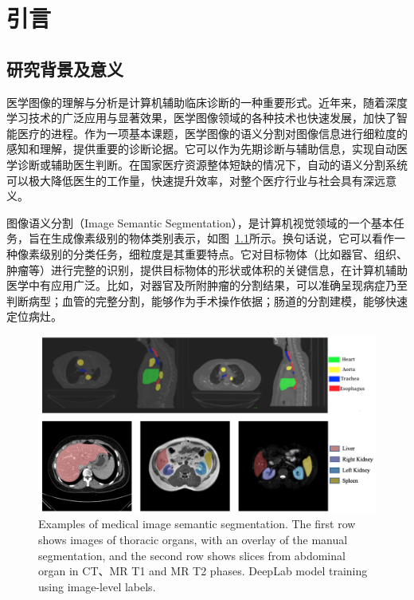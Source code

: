 \chapter{引言}

\section{研究背景及意义}
医学图像的理解与分析是计算机辅助临床诊断的一种重要形式。近年来，随着深度学习技术的广泛应用与显著效果，医学图像领域的各种技术也快速发展，加快了智能医疗的进程。作为一项基本课题，医学图像的语义分割对图像信息进行细粒度的感知和理解，提供重要的诊断论据。它可以作为先期诊断与辅助信息，实现自动医学诊断或辅助医生判断。在国家医疗资源整体短缺的情况下，自动的语义分割系统可以极大降低医生的工作量，快速提升效率，对整个医疗行业与社会具有深远意义。

图像语义分割（Image Semantic Segmentation），是计算机视觉领域的一个基本任务，旨在生成像素级别的物体类别表示\citep{long2015fully,chen2017deeplab,ronneberger2015u,isensee2019automated}，如图~\ref{c1_fig1}所示。换句话说，它可以看作一种像素级别的分类任务，细粒度是其重要特点。它对目标物体（比如器官、组织、肿瘤等）进行完整的识别，提供目标物体的形状或体积的关键信息，在计算机辅助医学中有应用广泛。比如，对器官及所附肿瘤的分割结果，可以准确呈现病症乃至判断病型；血管的完整分割，能够作为手术操作依据；肠道的分割建模，能够快速定位病灶。

    \begin{figure}[tbp]
        \centering 
        \includegraphics[width=1.0\textwidth]{img/c1/intro_1.png}
        {Examples of medical image semantic segmentation. The first row shows images of thoracic organs, with an overlay of the manual segmentation, and the second row shows slices from abdominal organ in CT、MR T1 and MR T2 phases.
        DeepLab model training using image-level labels.}
        \label{c1_fig1}
    \end{figure}


